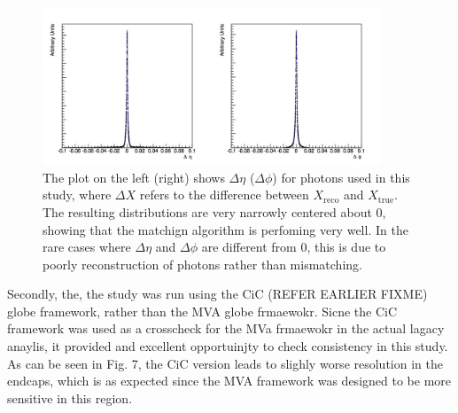 \documentclass[10pt]{article}
\begin{document}
\begin{figure}[h!]

  \centering
\includegraphics[width=0.9\textwidth]{"Delta"}
\caption{ The plot on the left (right) shows $\Delta \eta$ ($\Delta \phi$) for photons used in this study, where $\Delta X$ refers to the difference between $X_{\text{reco}}$ and $X_{\text{true}}$. The resulting distributions are very narrowly centered about 0, showing that the matchign algorithm is perfoming very well. In the rare cases where $\Delta \eta$ and $\Delta \phi$ are different from 0, this is due to poorly reconstruction of photons rather than mismatching.   }
\end{figure}
Secondly, the, the study was run using the CiC (REFER EARLIER FIXME) globe framework, rather than the MVA globe frmaewokr. Sicne the CiC framework was used as a crosscheck for the MVa frmaewokr in the actual lagacy anaylis, it provided and excellent opportuinjty to check consistency in this study. As can be seen in Fig. 7, the CiC version leads to slighly worse resolution in the endcaps, which is as expected since the MVA framework was designed to be more sensitive in this region.
\end{document}

